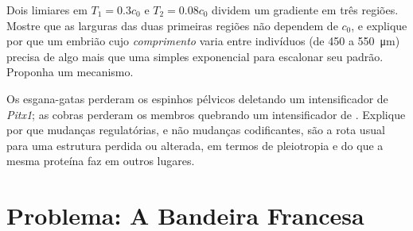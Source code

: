 \begin{exercise}[$\star\star\star$]\label{exo:b3:developmental-genetics:11}
Dois limiares em $T_{1} = 0.3c_{0}$ e $T_{2} = 0.08c_{0}$ dividem um
gradiente em três regiões. Mostre que as larguras das duas primeiras
regiões não dependem de $c_{0}$, e explique por que um embrião cujo
\emph{comprimento} varia entre indivíduos (de \qty{450}{} a
\qty{550}{\micro m}) precisa de algo mais que uma simples exponencial
para escalonar seu padrão. Proponha um mecanismo.
\end{exercise}

\begin{exercise}[$\star\star\star$]\label{exo:b3:developmental-genetics:12}
Os esgana-gatas perderam os espinhos pélvicos deletando um
intensificador de \emph{Pitx1}; as cobras perderam os membros quebrando
um intensificador de \emph{}. Explique por que mudanças
regulatórias, e não mudanças codificantes, são a rota usual para uma
estrutura perdida ou alterada, em termos de pleiotropia e do que a mesma
proteína faz em outros lugares.
\end{exercise}

\section{Problema: A Bandeira Francesa}

